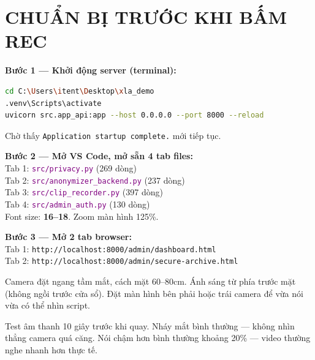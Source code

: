 \documentclass[12pt, a4paper]{article}
\newcommand{\fpath}[1]{\texttt{\textcolor{purple}{#1}}}
\begin{document}
\tableofcontents\newpage

\section{CHUẨN BỊ TRƯỚC KHI BẤM REC}

\begin{doact}
\textbf{Bước 1 --- Khởi động server (terminal):}
\begin{lstlisting}[language=bash, numbers=none]
cd C:\Users\itent\Desktop\xla_demo
.venv\Scripts\activate
uvicorn src.app_api:app --host 0.0.0.0 --port 8000 --reload
\end{lstlisting}
Chờ thấy \texttt{Application startup complete.} mới tiếp tục.
\end{doact}

\begin{doact}
\textbf{Bước 2 --- Mở VS Code, mở sẵn 4 tab files:}\\
Tab 1: \fpath{src/privacy.py} (269 dòng)\\
Tab 2: \fpath{src/anonymizer\_backend.py} (237 dòng)\\
Tab 3: \fpath{src/clip\_recorder.py} (397 dòng)\\
Tab 4: \fpath{src/admin\_auth.py} (130 dòng)\\
Font size: \textbf{16--18}. Zoom màn hình 125\%.
\end{doact}

\begin{doact}
\textbf{Bước 3 --- Mở 2 tab browser:}\\
Tab 1: \texttt{http://localhost:8000/admin/dashboard.html}\\
Tab 2: \texttt{http://localhost:8000/admin/secure-archive.html}
\end{doact}

\begin{cam}
Camera đặt ngang tầm mắt, cách mặt 60--80cm.
Ánh sáng từ phía trước mặt (không ngồi trước cửa sổ).
Đặt màn hình bên phải hoặc trái camera để vừa nói vừa có thể nhìn script.
\end{cam}

\begin{warn}
Test âm thanh 10 giây trước khi quay.
Nháy mắt bình thường --- không nhìn thẳng camera quá căng.
Nói chậm hơn bình thường khoảng 20\% --- video thường nghe nhanh hơn thực tế.
\end{warn}
\end{document}
